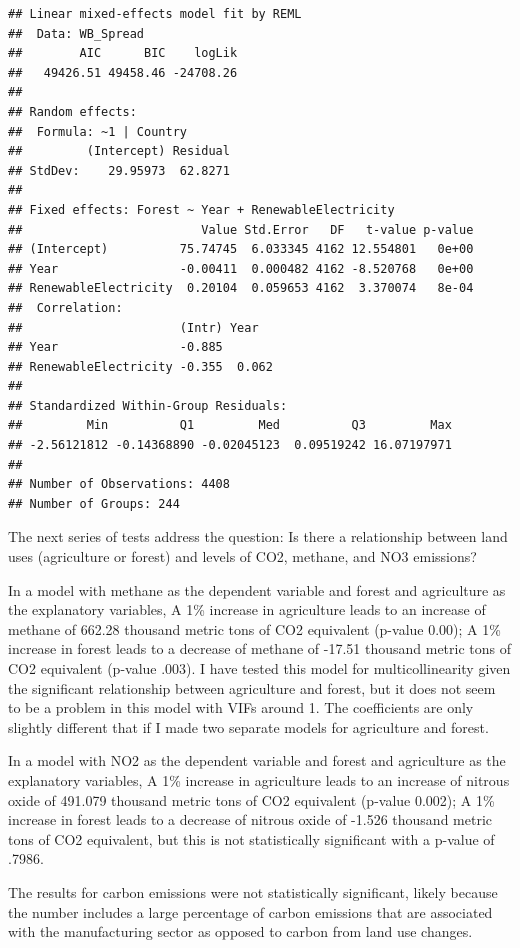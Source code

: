 \documentclass[12pt,]{article}
\begin{document}
\begin{verbatim}
## Linear mixed-effects model fit by REML
##  Data: WB_Spread 
##        AIC      BIC    logLik
##   49426.51 49458.46 -24708.26
## 
## Random effects:
##  Formula: ~1 | Country
##         (Intercept) Residual
## StdDev:    29.95973  62.8271
## 
## Fixed effects: Forest ~ Year + RenewableElectricity 
##                         Value Std.Error   DF   t-value p-value
## (Intercept)          75.74745  6.033345 4162 12.554801   0e+00
## Year                 -0.00411  0.000482 4162 -8.520768   0e+00
## RenewableElectricity  0.20104  0.059653 4162  3.370074   8e-04
##  Correlation: 
##                      (Intr) Year  
## Year                 -0.885       
## RenewableElectricity -0.355  0.062
## 
## Standardized Within-Group Residuals:
##         Min          Q1         Med          Q3         Max 
## -2.56121812 -0.14368890 -0.02045123  0.09519242 16.07197971 
## 
## Number of Observations: 4408
## Number of Groups: 244
\end{verbatim}

The next series of tests address the question: Is there a relationship
between land uses (agriculture or forest) and levels of CO2, methane,
and NO3 emissions?

In a model with methane as the dependent variable and forest and
agriculture as the explanatory variables, A 1\% increase in agriculture
leads to an increase of methane of 662.28 thousand metric tons of CO2
equivalent (p-value 0.00); A 1\% increase in forest leads to a decrease
of methane of -17.51 thousand metric tons of CO2 equivalent (p-value
.003). I have tested this model for multicollinearity given the
significant relationship between agriculture and forest, but it does not
seem to be a problem in this model with VIFs around 1. The coefficients
are only slightly different that if I made two separate models for
agriculture and forest.

In a model with NO2 as the dependent variable and forest and agriculture
as the explanatory variables, A 1\% increase in agriculture leads to an
increase of nitrous oxide of 491.079 thousand metric tons of CO2
equivalent (p-value 0.002); A 1\% increase in forest leads to a decrease
of nitrous oxide of -1.526 thousand metric tons of CO2 equivalent, but
this is not statistically significant with a p-value of .7986.

The results for carbon emissions were not statistically significant,
likely because the number includes a large percentage of carbon
emissions that are associated with the manufacturing sector as opposed
to carbon from land use changes.
\end{document}
